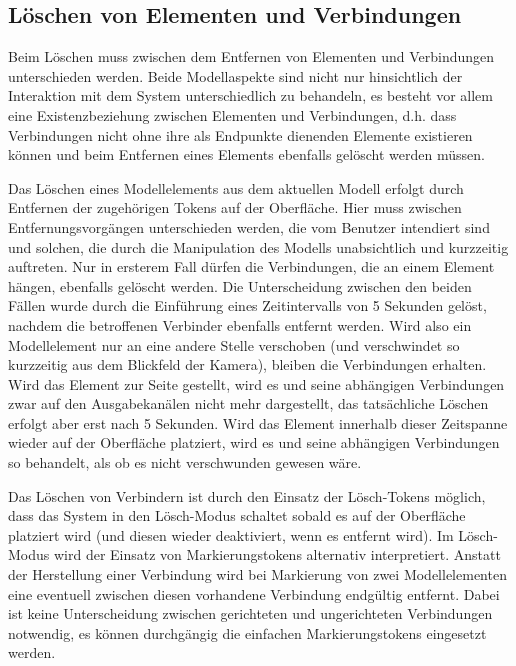 \subsection{Löschen von Elementen und Verbindungen} %
\label{sub:löschen_von_elementen}

Beim Löschen muss zwischen dem Entfernen von Elementen und Verbindungen unterschieden werden. Beide Modellaspekte sind nicht nur hinsichtlich der Interaktion mit dem System unterschiedlich zu behandeln, es besteht vor allem eine Existenzbeziehung zwischen Elementen und Verbindungen, d.h. dass Verbindungen nicht ohne ihre als Endpunkte dienenden Elemente existieren können und beim Entfernen eines Elements ebenfalls gelöscht werden müssen.

Das Löschen eines Modellelements aus dem aktuellen Modell erfolgt durch Entfernen der zugehörigen Tokens auf der Oberfläche. Hier muss zwischen Entfernungsvorgängen unterschieden werden, die vom Benutzer intendiert sind und solchen, die durch die Manipulation des Modells unabsichtlich und kurzzeitig auftreten. Nur in ersterem Fall dürfen die Verbindungen, die an einem Element hängen, ebenfalls gelöscht werden. Die Unterscheidung zwischen den beiden Fällen wurde durch die Einführung eines Zeitintervalls von 5 Sekunden gelöst, nachdem die betroffenen Verbinder ebenfalls entfernt werden. Wird also ein Modellelement nur an eine andere Stelle verschoben (und verschwindet so kurzzeitig aus dem Blickfeld der Kamera), bleiben die Verbindungen erhalten. Wird das Element zur Seite gestellt, wird es und seine abhängigen Verbindungen zwar auf den Ausgabekanälen nicht mehr dargestellt, das tatsächliche Löschen erfolgt aber erst nach 5 Sekunden. Wird das Element innerhalb dieser Zeitspanne wieder auf der Oberfläche platziert, wird es und seine abhängigen Verbindungen so behandelt, als ob es nicht verschwunden gewesen wäre.

Das Löschen von Verbindern ist durch den Einsatz der Lösch-Tokens möglich, dass das System in den Lösch-Modus schaltet sobald es auf der Oberfläche platziert wird (und diesen wieder deaktiviert, wenn es entfernt wird). Im Lösch-Modus wird der Einsatz von Markierungstokens alternativ interpretiert. Anstatt der Herstellung einer Verbindung wird bei Markierung von zwei Modellelementen eine eventuell zwischen diesen vorhandene Verbindung endgültig entfernt. Dabei ist keine Unterscheidung zwischen gerichteten und ungerichteten Verbindungen notwendig, es können durchgängig die einfachen Markierungstokens eingesetzt werden.


